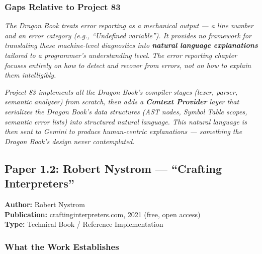 \documentclass[a4paper,11pt]{article}
\newcommand{\papergap}[1]{%
  \begin{tcolorbox}[colback=red!5!white, colframe=red!60!black, title={Research Gap Identified}]
  \textit{#1}
  \end{tcolorbox}
}
\newcommand{\oursolution}[1]{%
  \begin{tcolorbox}[colback=green!5!white, colframe=green!60!black, title={How Project 83 Solves This Gap}]
  \textit{#1}
  \end{tcolorbox}
}
\begin{document}
\subsubsection{Gaps Relative to Project 83}

\papergap{The Dragon Book treats error reporting as a mechanical output --- a line number and an error category (e.g., ``Undefined variable''). It provides no framework for translating these machine-level diagnostics into \textbf{natural language explanations} tailored to a programmer's understanding level. The error reporting chapter focuses entirely on how to \textit{detect} and \textit{recover} from errors, not on how to \textit{explain} them intelligibly.}

\oursolution{Project 83 implements all the Dragon Book's compiler stages (lexer, parser, semantic analyzer) from scratch, then adds a \textbf{Context Provider} layer that serializes the Dragon Book's data structures (AST nodes, Symbol Table scopes, semantic error lists) into structured natural language. This natural language is then sent to Gemini to produce human-centric explanations --- something the Dragon Book's design never contemplated.}

\subsection{Paper 1.2: Robert Nystrom --- ``Crafting Interpreters''}

\begin{tcolorbox}[colback=gray!5, colframe=gray!40]
\textbf{Author:} Robert Nystrom \\
\textbf{Publication:} craftinginterpreters.com, 2021 (free, open access) \\
\textbf{Type:} Technical Book / Reference Implementation
\end{tcolorbox}

\subsubsection{What the Work Establishes}
\end{document}
